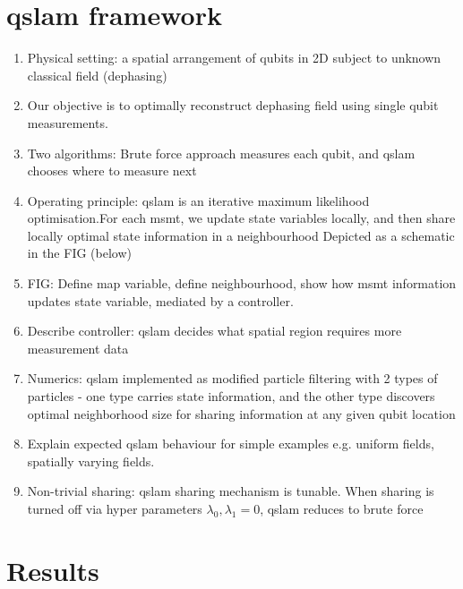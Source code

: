 \section{qslam framework}
\begin{enumerate}
	\item Physical setting:  a spatial arrangement of qubits in 2D subject to unknown classical field (dephasing) 
	\item Our objective is to optimally reconstruct dephasing field using single qubit measurements.
	\item Two algorithms: Brute force approach measures each qubit, and qslam chooses where to measure next
	\item Operating principle: qslam is an iterative maximum likelihood optimisation.For each msmt, we update state variables locally, and then share locally optimal state information in a neighbourhood  Depicted as a schematic in the FIG (below) 
	\item FIG: Define map variable, define neighbourhood, show how msmt information updates state variable, mediated by a controller. 
	\item Describe controller: qslam decides what spatial region requires more measurement data 
	\item Numerics: qslam implemented as modified particle filtering with 2 types of particles - one type carries state information, and the other type discovers optimal neighborhood size for sharing information at any given qubit location
	\item Explain expected qslam behaviour for simple examples e.g. uniform fields, spatially varying fields. 
	\item Non-trivial sharing: qslam sharing mechanism is tunable. When sharing  is turned off via hyper parameters $\lambda_0, \lambda_1 = 0 $, qslam reduces to  brute force  
\end{enumerate} 

\section{Results}

